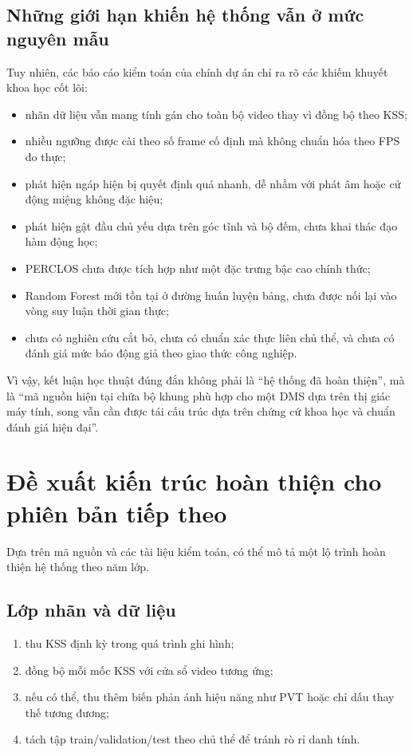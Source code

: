 \documentclass[12pt,a4paper]{article}
\begin{document}
\subsection{Những giới hạn khiến hệ thống vẫn ở mức nguyên mẫu}
Tuy nhiên, các báo cáo kiểm toán của chính dự án chỉ ra rõ các khiếm khuyết khoa học cốt lõi:
\begin{itemize}
  \item nhãn dữ liệu vẫn mang tính gán cho toàn bộ video thay vì đồng bộ theo KSS;
  \item nhiều ngưỡng được cài theo số frame cố định mà không chuẩn hóa theo FPS đo thực;
  \item phát hiện ngáp hiện bị quyết định quá nhanh, dễ nhầm với phát âm hoặc cử động miệng không đặc hiệu;
  \item phát hiện gật đầu chủ yếu dựa trên góc tĩnh và bộ đếm, chưa khai thác đạo hàm động học;
  \item PERCLOS chưa được tích hợp như một đặc trưng bậc cao chính thức;
  \item Random Forest mới tồn tại ở đường huấn luyện bảng, chưa được nối lại vào vòng suy luận thời gian thực;
  \item chưa có nghiên cứu cắt bỏ, chưa có chuẩn xác thực liên chủ thể, và chưa có đánh giá mức báo động giả theo giao thức công nghiệp.
\end{itemize}
Vì vậy, kết luận học thuật đúng đắn không phải là ``hệ thống đã hoàn thiện'', mà là ``mã nguồn hiện tại chứa bộ khung phù hợp cho một DMS dựa trên thị giác máy tính, song vẫn cần được tái cấu trúc dựa trên chứng cứ khoa học và chuẩn đánh giá hiện đại''.

\section{Đề xuất kiến trúc hoàn thiện cho phiên bản tiếp theo}
Dựa trên mã nguồn và các tài liệu kiểm toán, có thể mô tả một lộ trình hoàn thiện hệ thống theo năm lớp.

\subsection{Lớp nhãn và dữ liệu}
\begin{enumerate}[label=\arabic*.]
  \item thu KSS định kỳ trong quá trình ghi hình;
  \item đồng bộ mỗi mốc KSS với cửa sổ video tương ứng;
  \item nếu có thể, thu thêm biến phản ánh hiệu năng như PVT hoặc chỉ dấu thay thế tương đương;
  \item tách tập train/validation/test theo chủ thể để tránh rò rỉ danh tính.
\end{enumerate}
\end{document}
